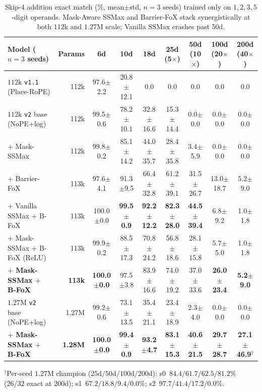\documentclass[10pt]{article}
\begin{document}
\begin{table}[t]
  \centering
  \caption{Skip-4 addition exact match (\%, mean$\pm$std, $n=3$ seeds) trained only on $1,2,3,5$-digit operands. Mask-Aware SSMax and Barrier-FoX stack synergistically at both $112\text{k}$ and $1.27\text{M}$ scale; Vanilla SSMax crashes past $50\text{d}$.}
  \label{tab:add}
  \footnotesize
  \renewcommand{\arraystretch}{1.14}
  \setlength{\tabcolsep}{2.2pt}
  \begin{tabular}{@{}lrccccccc@{}}
    \toprule
    Model ($n=3$ seeds) & Params & 6d & 10d & 18d & \textbf{25d (5$\times$)} & \textbf{50d (10$\times$)} & \textbf{100d (20$\times$)} & \textbf{200d (40$\times$)} \\
    \midrule
    $112\text{k}$ \texttt{v1.1} (Place-RoPE) & 112k & 97.6$\pm$2.2 & 20.8$\pm$12.1 & 0.0 & 0.0 & 0.0 & 0.0 & 0.0 \\
    \midrule
    $112\text{k}$ \texttt{v2} base (NoPE+log) & 112k & 99.5$\pm$0.6 & 78.2$\pm$10.1 & 32.8$\pm$16.6 & 15.3$\pm$14.4 & 0.0$\pm$0.0 & 0.0$\pm$0.0 & 0.0$\pm$0.0 \\
    \quad $+$ Mask-SSMax & 112k & 99.8$\pm$0.2 & 85.1$\pm$14.2 & 44.0$\pm$35.7 & 28.4$\pm$35.8 & 3.4$\pm$5.9 & 0.0$\pm$0.0 & 0.0$\pm$0.0 \\
    \quad $+$ Barrier-FoX & 113k & 97.6$\pm$4.1 & 91.3$\pm$9.5 & 66.4$\pm$32.8 & 61.2$\pm$39.1 & 31.5$\pm$26.7 & 13.0$\pm$18.7 & 5.2$\pm$9.0 \\
    \quad $+$ Vanilla SSMax + B-FoX & 113k & 100.0$\pm$0.0 & \textbf{99.5$\pm$0.9} & \textbf{92.2$\pm$12.2} & \textbf{82.3$\pm$28.0} & \textbf{44.5$\pm$39.4} & 6.8$\pm$9.2 & 1.0$\pm$1.8 \\
    \quad $+$ Mask-SSMax + B-FoX (ReLU) & 113k & 99.9$\pm$0.2 & 88.5$\pm$17.3 & 70.8$\pm$24.2 & 56.8$\pm$18.6 & 28.1$\pm$15.8 & 5.7$\pm$5.0 & 1.0$\pm$1.8 \\
    \quad \textbf{$+$ Mask-SSMax $+$ B-FoX} & \textbf{113k} & \textbf{100.0$\pm$0.0} & 97.5$\pm$3.8 & 83.9$\pm$16.6 & 74.0$\pm$19.2 & 37.0$\pm$33.6 & \textbf{26.0$\pm$23.4} & \textbf{5.2$\pm$9.0} \\
    \midrule
    $1.27\text{M}$ \texttt{v2} base (NoPE+log) & 1.27M & 99.2$\pm$0.6 & 73.1$\pm$13.5 & 35.4$\pm$21.1 & 23.4$\pm$18.9 & 2.3$\pm$4.0 & 0.0$\pm$0.0 & 0.0$\pm$0.0 \\
    \quad \textbf{$+$ Mask-SSMax $+$ B-FoX} & \textbf{1.28M} & \textbf{100.0$\pm$0.0} & \textbf{99.4$\pm$0.9} & \textbf{93.2$\pm$4.7} & \textbf{83.1$\pm$15.3} & \textbf{40.6$\pm$21.5} & \textbf{29.7$\pm$28.7} & \textbf{27.1$\pm$46.9}$^\dagger$ \\
    \bottomrule
  \end{tabular}
  \vspace{2pt}
  \parbox{\textwidth}{\footnotesize\color{muted} $^\dagger$Per-seed $1.27\text{M}$ champion ($25\text{d}/50\text{d}/100\text{d}/200\text{d}$): s0~$84.4/61.7/62.5/\mathbf{81.2\%}$ (26/32 exact at $200\text{d}$); s1~$67.2/18.8/9.4/0.0\%$; s2~$\mathbf{97.7}/41.4/17.2/0.0\%$.}
\end{table}
\end{document}
